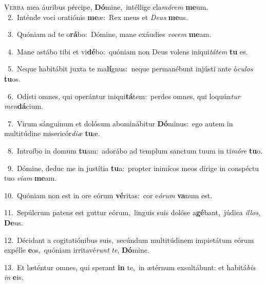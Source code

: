 \lettrine{\initial\textcolor{\initialcolor}{V}}{erba} mea áuribus pércipe, \textbf{Dó}\-mine,~\star intéllige cla\-\textit{mó}\-\textit{rem} \textbf{me}\-um.\\
{\numbfont\textcolor{\numbcolor}{~2.}}~Inténde voci oratiónis \textbf{me}\-æ:~\star Rex meus et \textit{De}\-\textit{us} \textbf{me}\-us.\par
{\numbfont\textcolor{\numbcolor}{~3.}}~Quóniam ad te o\-\textbf{rá}\-bo:~\star Dómine, mane exáudies \textit{vo}\-\textit{cem} \textbf{me}\-am.\par
{\numbfont\textcolor{\numbcolor}{~4.}}~Mane astábo tibi et vi\-\textbf{dé}\-bo:~\star quóniam non Deus volens iniqui\-\textit{tá}\-\textit{tem} \textbf{tu} es.\par
{\numbfont\textcolor{\numbcolor}{~5.}}~Neque habitábit juxta te ma\-\textbf{lí}\-gnus:~\star neque permanébunt injústi ante ó\-\textit{cu}\-\textit{los} \textbf{tu}\-os.\par
{\numbfont\textcolor{\numbcolor}{~6.}}~Odísti omnes, qui operántur iniqui\-\textbf{tá}\-tem:~\star perdes omnes, qui loquún\textit{tur} \textit{men}\-\textbf{dá}cium.\par
{\numbfont\textcolor{\numbcolor}{~7.}}~Virum sánguinum et dolósum abominábitur \textbf{Dó}\-minus:~\star ego autem in multitúdine misericór\-\textit{di}\-\textit{æ} \textbf{tu}\-æ.\par
{\numbfont\textcolor{\numbcolor}{~8.}}~Introíbo in domum \textbf{tu}\-am:~\star adorábo ad templum sanctum tuum in ti\-\textit{mó}\-\textit{re} \textbf{tu}\-o.\par
{\numbfont\textcolor{\numbcolor}{~9.}}~Dómine, deduc me in justítia \textbf{tu}\-a:~\star propter inimícos meos dírige in conspéctu tuo \textit{vi}\-\textit{am} \textbf{me}\-am.\par
{\numbfont\textcolor{\numbcolor}{10.}}~Quóniam non est in ore eórum \textbf{vé}\-ritas:~\star cor e\-\textit{ó}\-\textit{rum} \textbf{va}\-num est.\par
{\numbfont\textcolor{\numbcolor}{11.}}~Sepúlcrum patens est guttur eórum,~\dagger linguis suis dolóse a\-\textbf{gé}\-bant,~\star júdica \textit{il}\-\textit{los}, \textbf{De}\-us.\par
{\numbfont\textcolor{\numbcolor}{12.}}~Décidant a cogitatiónibus suis,~\dagger secúndum multitúdinem impietátum eórum expélle \textbf{e}\-os,~\star quóniam irritavé\textit{runt} \textit{te}\-, \textbf{Dó}\-mine.\par
{\numbfont\textcolor{\numbcolor}{13.}}~Et læténtur omnes, qui sperant \textbf{in} te,~\star in ætérnum exsultábunt: et habitá\textit{bis} \textit{in} \textbf{e}\-is.\par

